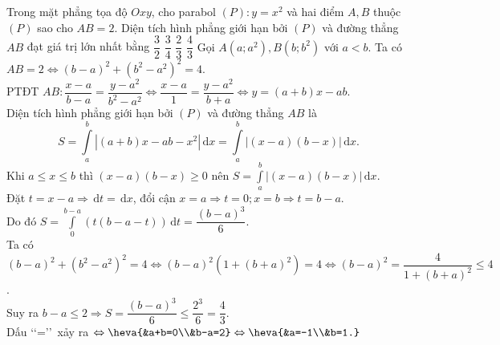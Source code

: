 \begin{ex}%
Trong mặt phẳng tọa độ $Oxy$, cho parabol $(P)\colon y =x^2$ và hai điểm $A, B$ thuộc $(P)$ sao cho
$AB= 2$. Diện tích hình phẳng giới hạn bởi $(P)$ và đường thẳng $AB$ đạt giá trị lớn nhất bằng
\choice
{$\dfrac{3}{2}$}
{$\dfrac{3}{4}$}
{$\dfrac{2}{3}$}
{\True $\dfrac{4}{3}$}
\loigiai
{Gọi $A(a;a^2), B(b;b^2)$ với $a<b$. Ta có $AB=2\Leftrightarrow (b-a)^2+(b^2-a^2)^2=4$.\\
PTĐT $AB\colon\dfrac{x-a}{b-a}=\dfrac{y-a^2}{b^2-a^2}\Leftrightarrow\dfrac{x-a}{1}=\dfrac{y-a^2}{b+a}\Leftrightarrow y = (a+b)x-ab.$\\
Diện tích hình phẳng giới hạn bởi $(P)$ và đường thẳng $AB$ là
$$S= \displaystyle\int\limits_a^b |(a+b)x-ab-x^2|\mathrm{\,d}x = \displaystyle\int\limits_a^b |(x-a)(b-x)|\mathrm{\,d}x.$$
Khi $a\leq x \leq b$ thì $(x-a)(b-x)\geq 0$ nên $S= \displaystyle\int\limits_a^b |(x-a)(b-x)|\mathrm{\,d}x$. \\
Đặt $t = x-a\Rightarrow \mathrm{\,d}t=\mathrm{\,d}x$, đổi cận $x=a\Rightarrow t=0; x=b \Rightarrow t = b-a$.\\
Do đó $S= \displaystyle\int\limits_0^{b-a} \left(t(b-a-t)\right)\mathrm{\,d}t=\dfrac{(b-a)^3}{6}.$\\
Ta có $(b-a)^2+(b^2-a^2)^2=4\Leftrightarrow(b-a)^2(1+(b+a)^2)=4\Leftrightarrow(b-a)^2=\dfrac{4}{1+(b+a)^2}\leq 4$.\\
Suy ra $b-a \leq 2 \Rightarrow S = \dfrac{(b-a)^3}{6}\leq \dfrac{2^3}{6}=\dfrac{4}{3}.$\\
Dấu \lq\lq=\rq\rq\, xảy ra $\Leftrightarrow\heva{&a+b=0\\&b-a=2}\Leftrightarrow \heva{&a=-1\\&b=1.}$
}
\end{ex}

